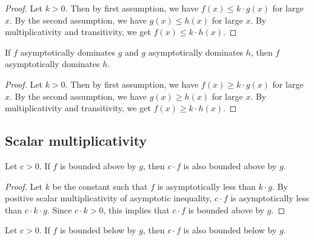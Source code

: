 \begin{proof}
    \leanok
    Let $k > 0$. Then by first assumption, we have $f(x) \le k \cdot g(x)$ for large 
    $x$. By the second assumption, we have $g(x) \le h(x)$ for large $x$. By multiplicativity 
    and transitivity, we get $f(x) \le k \cdot h(x)$.
\end{proof}

\begin{lemma}
    \label{lemma:asymp_left_dom_trans}
    \leanok
    If $f$ asymptotically dominates $g$ and $g$ asymptotically dominates $h$, then 
    $f$ asymptotically dominates $h$.
\end{lemma}

\begin{proof}
    \leanok
    Let $k > 0$. Then by first assumption, we have $f(x) \ge k \cdot g(x)$ for large 
    $x$. By the second assumption, we have $g(x) \ge h(x)$ for large $x$. By multiplicativity 
    and transitivity, we get $f(x) \ge k \cdot h(x)$.
\end{proof}


\subsection{Scalar multiplicativity}

\begin{lemma}
    \label{lemma:asymp_bounded_above_pos_smul}
    \leanok
    Let $c > 0$. If $f$ is bounded above by $g$, then $c \cdot f$ is also bounded
    above by $g$.
\end{lemma}

\begin{proof}
    \leanok
    Let $k$ be the constant such that $f$ is asymptotically less than $k \cdot g$.
    By positive scalar multiplicativity of asymptotic inequality, $c \cdot f$ is 
    asymptotically less than $c \cdot k \cdot g$. Since $c \cdot k > 0$, this implies 
    that $c \cdot f$ is bounded above by $g$.
\end{proof}

\begin{lemma}
    \label{lemma:asymp_bounded_below_pos_smul}
    \leanok
    Let $c > 0$. If $f$ is bounded below by $g$, then $c \cdot f$ is also bounded
    below by $g$.
\end{lemma}

